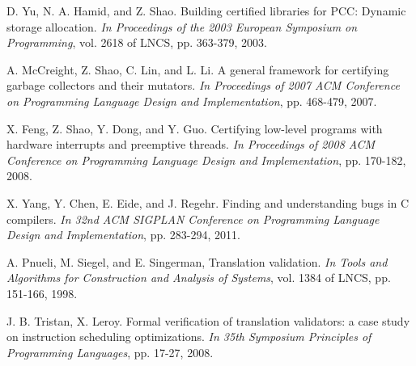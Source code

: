 \documentclass[10pt, conference, compsocconf]{IEEEtran}
\begin{document}
\begin{thebibliography}{1}
   D. Yu, N. A. Hamid, and Z. Shao. Building certified libraries for PCC: Dynamic storage allocation. \emph{In Proceedings of the 2003 European Symposium on Programming}, vol. 2618 of LNCS, pp. 363-379, 2003.

   A. McCreight, Z. Shao, C. Lin, and L. Li. A general framework for certifying garbage collectors and their mutators. \emph{In Proceedings of  2007 ACM Conference on Programming Language Design and Implementation}, pp. 468-479, 2007.

   X. Feng, Z. Shao, Y. Dong, and Y. Guo. Certifying low-level programs with hardware interrupts and preemptive threads. \emph{In Proceedings of 2008 ACM Conference on Programming Language Design and Implementation}, pp. 170-182, 2008.

   X. Yang, Y. Chen, E. Eide, and J. Regehr. Finding and understanding bugs in C compilers. \emph{In 32nd ACM SIGPLAN Conference on Programming Language Design and Implementation}, pp. 283-294, 2011.
  
   A. Pnueli, M. Siegel, and E. Singerman, Translation validation. \emph{In Tools and Algorithms for Construction and Analysis of Systems}, vol. 1384 of LNCS, pp. 151-166, 1998.
  
   J. B. Tristan, X. Leroy. Formal verification of translation validators: a case study on instruction scheduling optimizations. \emph{In 35th Symposium Principles of Programming Languages}, pp. 17-27, 2008.
  


\end{thebibliography}




\end{document}
